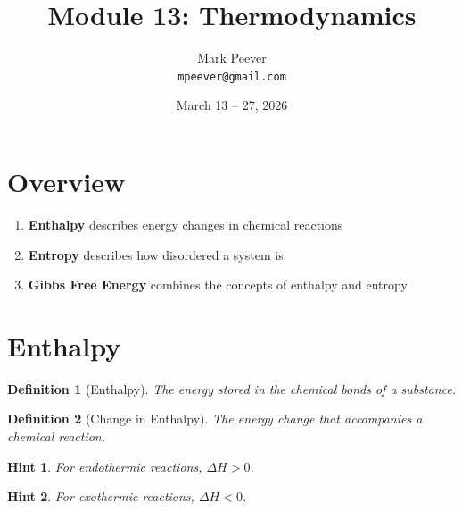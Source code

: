 \documentclass[11pt, oneside]{article}   	%
\title{Module 13: Thermodynamics}
\author{Mark Peever\\ \texttt{mpeever@gmail.com}}
\date{March 13 -- 27, 2026}
\newtheorem{definition}{Definition}
\newtheorem{hint}{Hint}
\begin{document}
\maketitle

\section{Overview}
\begin{enumerate}
\item \textbf{Enthalpy} describes energy changes in chemical reactions
\item \textbf{Entropy} describes how disordered a system is
\item \textbf{Gibbs Free Energy} combines the concepts of enthalpy and entropy
\end{enumerate}

\section{Enthalpy}

\begin{definition}[Enthalpy]\label{def:enthalpy}
The energy stored in the chemical bonds of a substance.
\end{definition}

\begin{definition}[Change in Enthalpy]\label{def:delta-enthalpy}
The energy change that accompanies a chemical reaction.
\end{definition}

\begin{hint}\label{hint:enthalpy-tip:endothermic}
For \emph{endothermic} reactions, $\Delta H > 0$.
\end{hint}
\begin{hint}\label{hint:enthalpy-tip:exothermic}
For \emph{exothermic} reactions, $\Delta H < 0$.
\end{hint}
\end{document}
